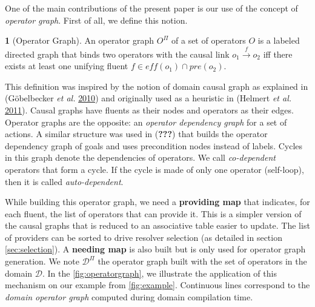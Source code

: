\documentclass[11pt,a4paper,twoside,openright,titlepage,numbers=noenddot,headinclude,cleardoublepage=empty,openany]{scrreprt}
\theoremstyle{plain}
\theoremstyle{definition}
\newtheorem{definition}{\capitalisewords{definition}}[]
\theoremstyle{remark}
\begin{document}
One of the main contributions of the present paper is our use of the
concept of \emph{operator graph}. First of all, we define this notion.

\begin{definition}[Operator Graph]

An operator graph \(O^\Pi\) of a set of operators \(O\) is a labeled
directed graph that binds two operators with the causal link
\(o_1 \xrightarrow{f} o_2\) iff there exists at least one unifying
fluent \(f \in eff(o_1) \cap pre(o_2)\).

\end{definition}

This definition was inspired by the notion of domain causal graph as
explained in (Göbelbecker \emph{et al.}
\protect\hyperlink{ref-gobelbecker_coming_2010}{2010}) and originally
used as a heuristic in (Helmert \emph{et al.}
\protect\hyperlink{ref-helmert_fast_2011}{2011}). Causal graphs have
fluents as their nodes and operators as their edges. Operator graphs are
the opposite: an \emph{operator dependency graph} for a set of actions.
A similar structure was used in ({\textbf{???}}) that builds the
operator dependency graph of goals and uses precondition nodes instead
of labels. Cycles in this graph denote the dependencies of operators. We
call \emph{co-dependent} operators that form a cycle. If the cycle is
made of only one operator (self-loop), then it is called
\emph{auto-dependent}.

While building this operator graph, we need a \textbf{providing map}
that indicates, for each fluent, the list of operators that can provide
it. This is a simpler version of the causal graphs that is reduced to an
associative table easier to update. The list of providers can be sorted
to drive resolver selection (as detailed in
section \ref{sec:selection}). A \textbf{needing map} is also built but
is only used for operator graph generation. We note \(\mathcal{D}^\Pi\)
the operator graph built with the set of operators in the domain
\(\mathcal{D}\). In the \cref{fig:operatorgraph}, we illustrate the
application of this mechanism on our example from \cref{fig:example}.
Continuous lines correspond to the \emph{domain operator graph} computed
during domain compilation time.
\end{document}
